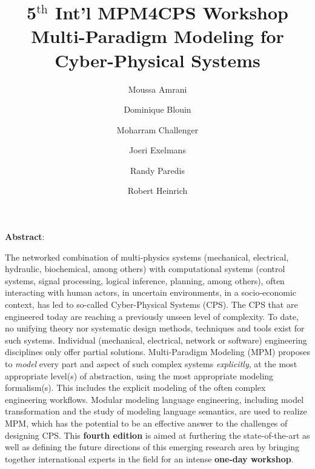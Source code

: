 \documentclass[runningheads]{llncs}
\begin{document}
\title{5$^{\textrm{th}}$ Int'l MPM4CPS Workshop\\
{\small Multi-Paradigm Modeling for Cyber-Physical Systems}}

\vspace{-1cm}
\author{
   Moussa Amrani \and
   Dominique Blouin \and
   Moharram Challenger \and
   Joeri Exelmans \and
   Randy Paredis \and
   Robert Heinrich
}


%
%

\maketitle

\noindent
\textbf{Abstract}: 
\begin{small}
The networked combination of multi-physics systems (mechanical, 
electrical, hydraulic, biochemical, among others) with computational systems 
(control systems, signal processing, logical inference, planning, among others), 
often interacting with human actors, in uncertain environments, in a socio-economic 
context, has led to so-called Cyber-Physical Systems (CPS).
%
The CPS that are engineered today are reaching a previously unseen level of 
complexity.
To date, no unifying theory nor systematic design methods, techniques and tools 
exist for such systems.
Individual (mechanical, electrical, network or software) engineering disciplines 
only offer partial solutions.
Multi-Paradigm Modeling (MPM) proposes to \emph{model} every part and aspect of 
such complex systems \emph{explicitly}, at the most appropriate level(s) of 
abstraction, using the most appropriate modeling formalism(s).
This includes the explicit modeling of the often complex engineering workflows.
Modular modeling language engineering, including model transformation and the 
study of modeling language semantics, are used to realize MPM, which has the 
potential to be an effective answer to the challenges of designing CPS.
%
This \textbf{fourth edition} is aimed at furthering the state-of-the-art as well as 
defining the future directions of this emerging research area by bringing together 
international experts in the field for an intense \textbf{one-day workshop}.
\end{small}









\end{document}
